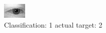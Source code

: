 \begin{figure}[h!]
\begin{center}
\includegraphics[width=0.60\columnwidth]{figures/ID390_class_1_target_2.png}
\end{center}
\caption{ Classification: 1 actual target: 2}
\label{fig:ID390_class_1_target_2}
\end{figure}
